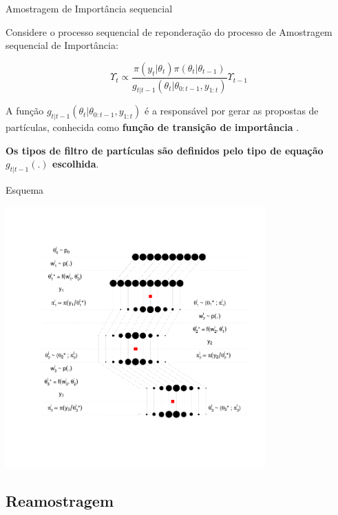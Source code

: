 \documentclass{beamer}
\begin{document}
\begin{frame}{Amostragem de Importância sequencial}

Considere o processo sequencial de reponderação do processo de Amostragem sequencial de Importância:

$$
\Upsilon_{t} \propto \frac{\pi(y_t|\theta_t)\pi(\theta_t|\theta_{t-1})}{g_{t|t-1}(\theta_t|\theta_{0:t-1},y_{1:t})} \Upsilon_{t-1}
$$

\pause

A função $g_{t|t-1}(\theta_t|\theta_{0:t-1},y_{1:t})$ é a responsável por gerar as propostas de partículas, conhecida como \textbf{função de transição de importância} \citep{Johansen2008}.

\vspace{0.5cm} 

\pause

\textbf{Os tipos de filtro de partículas são definidos pelo tipo de equação $g_{t|t-1}(.)$ escolhida}. 

\end{frame}



\begin{frame}{Esquema}

  \begin{center}
  \includegraphics[height=10cm,keepaspectratio]{filtroparticulassequencial.pdf}
  \end{center}
  
  
\end{frame}

\subsection{Reamostragem}
\end{document}
